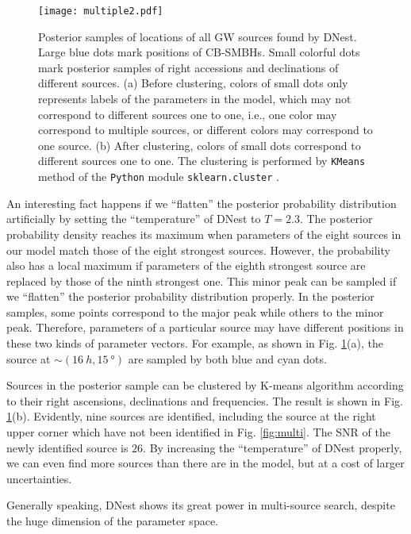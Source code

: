 \documentclass[times,tight]{aastex631}
\begin{document}
\begin{figure}
    \centering
    \texttt{[image: multiple2.pdf]}
    \caption{Posterior samples of locations of all GW sources found by DNest.
    Large blue dots mark positions of CB-SMBHs. 
    Small colorful dots mark posterior samples of right accessions and declinations of different sources.
    (a) Before clustering, colors of small dots only represents labels of the parameters in the model, which may not correspond to different sources one to one, i.e., one color may correspond to multiple sources, or different colors may correspond to one source.
    (b) After clustering, colors of small dots correspond to different sources one to one.
    The clustering is performed by \texttt{KMeans} method of the \texttt{Python} module  \texttt{sklearn.cluster} \citep{pedregosa2011}.
    \label{fig:multi2}}
\end{figure}

An interesting fact happens if we ``flatten'' the posterior probability distribution artificially by setting the ``temperature'' of DNest to $T=2.3$.
The posterior probability density reaches its maximum when parameters of the eight sources in our model match those of the eight strongest sources.
However, the probability also has a local maximum if parameters of the eighth strongest source are replaced by those of the ninth strongest one.
This minor peak can be sampled if we ``flatten'' the posterior probability distribution properly.
In the posterior samples, some points correspond to the major peak while others to the minor peak.
Therefore, parameters of a particular source may have different positions in these two kinds of parameter vectors.
For example, as shown in Fig. \ref{fig:multi2}(a), the source at $\sim (\SI{16}{h}, \SI{15}{\degree})$ are sampled by both blue and cyan dots.

Sources in the posterior sample can be clustered by K-means algorithm \citep{lloyd1982} according to their right ascensions, declinations and frequencies.
The result is shown in Fig. \ref{fig:multi2}(b).
Evidently, nine sources are identified, including the source at the right upper corner which have not been identified in Fig. \ref{fig:multi}.
The SNR of the newly identified source is $26$.
By increasing the ``temperature'' of DNest properly, we can even find more sources than there are in the model, but at a cost of larger uncertainties.

Generally speaking, DNest shows its great power in multi-source search, despite the huge dimension of the parameter space.
\end{document}
